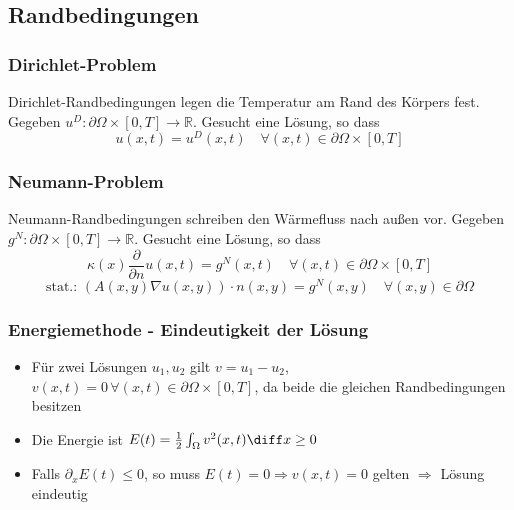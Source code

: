\subsection{Randbedingungen}
\begin{sectionbox}
    \subsubsection{Dirichlet-Problem}
    Dirichlet-Randbedingungen legen die Temperatur am Rand des Körpers fest. Gegeben $u^D:\partial\Omega \times [0,T]\rightarrow\mathbb R$.
    Gesucht eine Lösung, so dass \begin{equation*}
        u(x,t) = u^D(x,t) \quad \forall (x,t) \in \partial\Omega\times [0,T]
    \end{equation*}

    \subsubsection{Neumann-Problem}
    Neumann-Randbedingungen schreiben den Wärmefluss nach außen vor. Gegeben $g^N:\partial\Omega\times [0,T]\rightarrow\mathbb R$.
    Gesucht eine Lösung, so dass \begin{equation*}
        \kappa(x)\frac{\partial}{\partial n}u(x,t) = g^N(x,t) \quad \forall (x,t)\in\partial\Omega \times [0,T]
    \end{equation*}
    \begin{equation*}
        \text{stat.: } (A(x,y)\nabla u(x,y))\cdot n(x,y) = g^N(x,y) \quad \forall (x,y)\in\partial\Omega
    \end{equation*}

    \subsubsection{Energiemethode - Eindeutigkeit der Lösung}
    \begin{itemize}
        \item Für zwei Lösungen $u_1,u_2$ gilt $v=u_1-u_2$, $v(x,t)=0\,\forall (x,t)\in\partial\Omega\times[0,T]$, da beide die gleichen Randbedingungen besitzen
        \item Die Energie ist $E(t) = \frac{1}{2}\int_\Omega v^2(x,t)\diff x \ge 0$
        \item Falls $\partial_x E(t) \le 0$, so muss $E(t)=0 \Rightarrow v(x,t) = 0$ gelten $\Rightarrow$ Lösung eindeutig
    \end{itemize}
\end{sectionbox}

